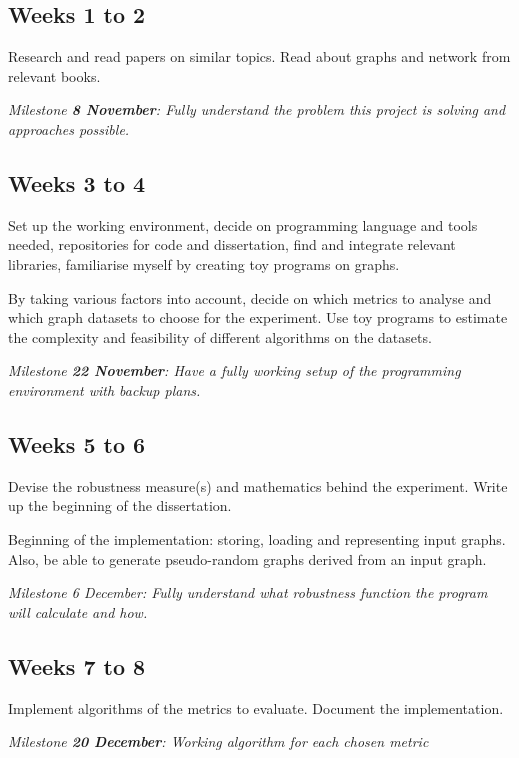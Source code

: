 \subsection*{Weeks 1 to 2}

Research and read papers on similar topics. Read about graphs and network from relevant books.

\textit{Milestone \textbf{8 November}: Fully understand the problem this project is solving and approaches possible.}

\subsection*{Weeks 3 to 4}

Set up the working environment, decide on programming language and tools needed, repositories for code and dissertation, find and integrate relevant libraries, familiarise myself by creating toy programs on graphs.

By taking various factors into account, decide on which metrics to analyse and which graph datasets to choose for the experiment. Use toy programs to estimate the complexity and feasibility of different algorithms on the datasets.

\textit{Milestone \textbf{22 November}: Have a fully working setup of the programming environment with backup plans.}

\subsection*{Weeks 5 to 6}

Devise the robustness measure(s) and mathematics behind the experiment. Write up the beginning of the dissertation.

Beginning of the implementation: storing, loading and representing input graphs. Also, be able to generate pseudo-random graphs derived from an input graph.

\textit{Milestone 6 December: Fully understand what robustness function the program will calculate and how.}

\subsection*{Weeks 7 to 8}

Implement algorithms of the metrics to evaluate. Document the implementation.

\textit{Milestone \textbf{20 December}: Working algorithm for each chosen metric}

